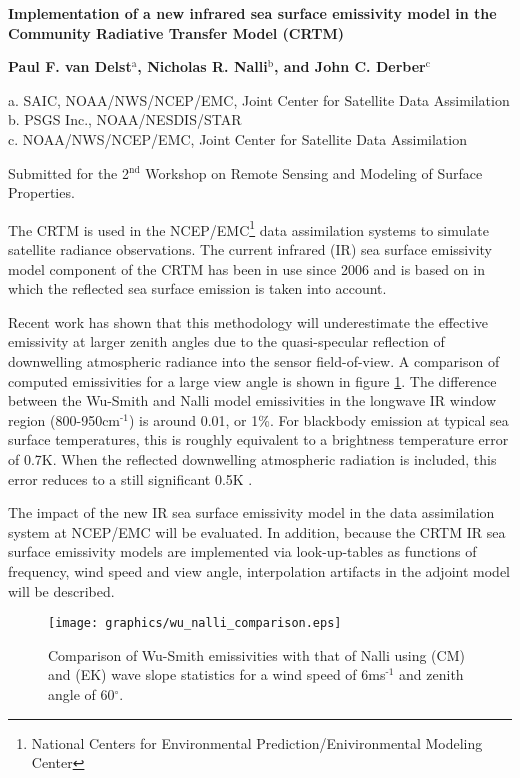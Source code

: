 \documentclass[10pt,letterpaper]{article}
\newcommand{\superscript}[1]{\ensuremath{^\textrm{#1}}}
\begin{document}
\thispagestyle{empty}

\begin{center}
  {\Large\bfseries Implementation of a new infrared sea surface emissivity model in the Community Radiative Transfer Model (CRTM)}\vspace{1.0em}
  
  {\bfseries Paul F. van Delst\superscript{a}, Nicholas R. Nalli\superscript{b}, and John C. Derber\superscript{c}}\vspace{1.0em}
  
  a. SAIC, NOAA/NWS/NCEP/EMC, Joint Center for Satellite Data Assimilation\\
  b. PSGS Inc., NOAA/NESDIS/STAR\\
  c. NOAA/NWS/NCEP/EMC, Joint Center for Satellite Data Assimilation\vspace{1.0em}
  
  Submitted for the 2\superscript{nd} Workshop on Remote Sensing and Modeling of Surface Properties.
\end{center}

The CRTM is used in the NCEP/EMC\footnote{National Centers for Environmental Prediction/Enivironmental Modeling Center} data assimilation systems to simulate satellite radiance observations. The current infrared (IR) sea surface emissivity model component of the CRTM has been in use since 2006 and is based on \cite{WuSmith_1997} in which the reflected sea surface emission is taken into account.

Recent work \citep{HanafinMinnett_2005,Nalli_2008a,Nalli_2008b} has shown that this methodology will underestimate the effective emissivity at larger zenith angles due to the quasi-specular reflection of downwelling atmospheric radiance into the sensor field-of-view. A comparison of computed emissivities for a large view angle is shown in figure \ref{fig:wu_nalli_comparison}. The difference between the Wu-Smith and Nalli model emissivities in the longwave IR window region (800-950cm\superscript{-1}) is around 0.01, or 1\%. For blackbody emission at typical sea surface temperatures, this is roughly equivalent to a brightness temperature error of 0.7K. When the reflected downwelling atmospheric radiation is included, this error reduces to a still significant 0.5K \citep{WuSmith_1996}.

The impact of the new IR sea surface emissivity model in the data assimilation system at NCEP/EMC will be evaluated. In addition, because the CRTM IR sea surface emissivity models are implemented via look-up-tables as functions of frequency, wind speed and view angle, interpolation artifacts in the adjoint model will be described.

\begin{figure}[htb]
  \centering
  \texttt{[image: graphics/wu\_nalli\_comparison.eps]}
  \caption{Comparison of Wu-Smith emissivities with that of Nalli using \citet{CoxMunk_1954} (CM) and \citet{EbuchiKizu_2002} (EK) wave slope statistics for a wind speed of 6ms\superscript{-1} and zenith angle of 60$^\circ$.}
  \label{fig:wu_nalli_comparison}
\end{figure}



\end{document}
